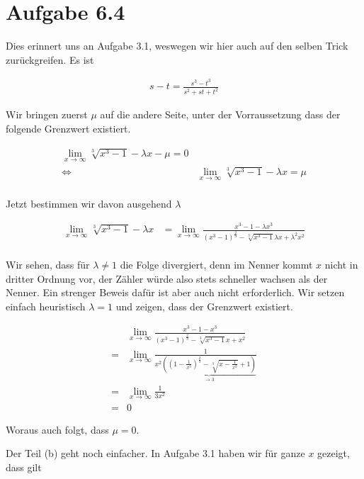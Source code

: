 \documentclass[a4paper,german,12pt,smallheadings]{scrartcl}
\begin{document}
\section*{Aufgabe 6.4}

Dies erinnert uns an Aufgabe 3.1, weswegen wir hier auch auf den selben Trick
zurückgreifen. Es ist

\begin{align*}
  s - t = \frac{s^3 - t^3}{s^2 + st + t^2}
\end{align*}

Wir bringen zuerst $\mu$ auf die andere Seite, unter der Vorraussetzung dass
der folgende Grenzwert existiert.

\begin{align*}
  \lim_{x \to \infty} \sqrt[3]{x^3 - 1} - \lambda x - \mu = 0\\
  \Leftrightarrow\quad&\lim_{x \to \infty} \sqrt[3]{x^3 - 1} - \lambda x = \mu \\
\end{align*}

Jetzt bestimmen wir davon ausgehend $\lambda$

\begin{align*}
  \lim_{x \to \infty} \sqrt[3]{x^3 - 1} - \lambda x &= \lim_{x \to \infty} \frac{x^3 - 1 - \lambda x^3}{(x^3 - 1)^\frac{2}{3} - \sqrt[3]{x^3 - 1}\lambda x + \lambda^2 x^2} \\
\end{align*}

Wir sehen, dass für $\lambda \neq 1$ die Folge divergiert, denn im Nenner kommt
$x$ nicht in dritter Ordnung vor, der Zähler würde also stets schneller wachsen
als der Nenner. Ein strenger Beweis dafür ist aber auch nicht erforderlich. Wir
setzen einfach heuristisch $\lambda = 1$ und zeigen, dass der Grenzwert
existiert.

\begin{align*}
  &\lim_{x \to \infty} \frac{x^3 - 1 - x^3}{(x^3 - 1)^\frac{2}{3} - \sqrt[3]{x^3 - 1}x + x^2} \\
  =&\lim_{x \to \infty} \frac{1}{x^2 \underbrace{((1 - \frac{1}{x^3})^\frac{2}{3} - \sqrt[3]{x - \frac{1}{x^3}} + 1)}_{\to 3}} \\
  =&\lim_{x \to \infty} \frac{1}{3x^2} \\
  =& 0
\end{align*}

Woraus auch folgt, dass $\mu = 0$.

Der Teil (b) geht noch einfacher. In Aufgabe 3.1 haben wir für ganze $x$
gezeigt, dass gilt
\end{document}
